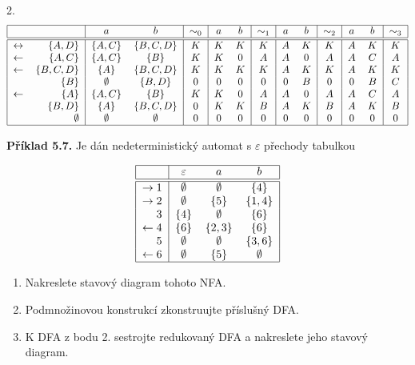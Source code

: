 \documentclass[11pt]{article}
\begin{document}
2.
\[
\begin{tabular}{|r r|c c|c|c c|c|c c|c|c c|c|}
    \hline
    & & $a$ & $b$ & $\sim_0$ & $a$ & $b$ & $\sim_1$ & $a$ & $b$ & $\sim_2$ & $a$ & $b$ & $\sim_3$\\
    \hline
    \hline
    $\leftrightarrow$& $\{A,D\}$   & $\{A,C\}$  & $\{B,C,D\}$ & $K$ & $K$ & $K$ & $K$ & $A$ & $K$ & $K$ & $A$ & $K$ & $K$\\
    $\leftarrow$     & $\{A,C\}$   & $\{A,C\}$  & $\{B\}$     & $K$ & $K$ & $0$ & $A$ & $A$ & $0$ & $A$ & $A$ & $C$ & $A$\\
    $\leftarrow$     & $\{B,C,D\}$ & $\{A\}$    & $\{B,C,D\}$ & $K$ & $K$ & $K$ & $K$ & $A$ & $K$ & $K$ & $A$ & $K$ & $K$\\
                     & $\{B\}$     & $\emptyset$& $\{B,D\}$   & $0$ & $0$ & $0$ & $0$ & $0$ & $B$ & $0$ & $0$ & $B$ & $C$\\
    $\leftarrow$     & $\{A\}$     & $\{A,C\}$  & $\{B\}$     & $K$ & $K$ & $0$ & $A$ & $A$ & $0$ & $A$ & $A$ & $C$ & $A$\\
                     & $\{B,D\}$   & $\{A\}$    & $\{B,C,D\}$ & $0$ & $K$ & $K$ & $B$ & $A$ & $K$ & $B$ & $A$ & $K$ & $B$\\
                     & $\emptyset$ &$\emptyset$ &$\emptyset$  & $0$ & $0$ & $0$ & $0$ & $0$ & $0$ & $0$ & $0$ & $0$ & $0$\\ 
    \hline
\end{tabular}
\]


\pagebreak 
\textbf{Příklad 5.7.} Je dán nedeterministický automat s $\varepsilon$ přechody tabulkou

\[
    \begin{tabular}{|r|c c c|}
        \hline
        & $\varepsilon$ & $a$ & $b$\\
        \hline
        \hline
        $\rightarrow 1$ & $\emptyset$ & $\emptyset$ & $\{4\}$\\
        $\rightarrow 2$ & $\emptyset$ & $\{5\}$ & $\{1, 4\}$\\
        $3$ & $\{4\}$ & $\emptyset$ & $\{6\}$\\
        $\leftarrow 4$ & $\{6\}$ & $\{2, 3\}$ & $\{6\}$\\
        $5$ & $\emptyset$ & $\emptyset$ & $\{3, 6\}$\\
        $\leftarrow 6$ & $\emptyset$ & $\{5\}$ & $\emptyset$\\
        \hline
    \end{tabular}
\]

\begin{enumerate}
    \item Nakreslete stavový diagram tohoto NFA.
    \item Podmnožinovou konstrukcí zkonstruujte příslušný DFA.
    \item K DFA z bodu 2. sestrojte redukovaný DFA a nakreslete jeho stavový diagram.
\end{enumerate}
\end{document}
